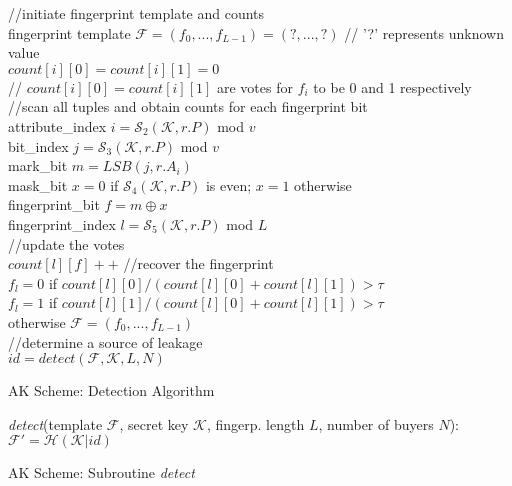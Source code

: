 \begin{algorithm}
  //initiate fingerprint template and counts \\
  fingerprint template $\mathcal{F}=(f_0,...,f_{L-1})=(?,...,?)$ // '?' represents unknown value \\
  {
    $count[i][0]=count[i][1]=0$ \\
    // $count[i][0]=count[i][1]$ are votes for $f_i$ to be 0 and 1 respectively
  }
  //scan all tuples and obtain counts for each fingerprint bit \\
  {
    {
        attribute\_index $i=\mathcal{S}_2(\mathcal{K},r.P)$ mod $v$\\
        bit\_index $j=\mathcal{S}_3(\mathcal{K}, r.P)$ mod $v$\\
        mark\_bit $m=LSB(j, r.A_i)$\\
        mask\_bit $x=0$ if $\mathcal{S}_4(\mathcal{K},r.P)$ is even; $x=1$ otherwise\\
        fingerprint\_bit $f=m \oplus x$\\
        fingerprint\_index $l=\mathcal{S}_5(\mathcal{K},r.P)$ mod $L$\\
        //update the votes\\
        $count[l][f]++$ 
    }
  }
  //recover the fingerprint\\
  {
    {
    }
    $f_l=0$ if $count[l][0]/(count[l][0]+count[l][1])>\tau$\\
    $f_l=1$ if $count[l][1]/(count[l][0]+count[l][1])>\tau$\\
     otherwise
  }
  $\mathcal{F}=(f_0,...,f_{L-1})$\\
  //determine a source of leakage\\
  $id=detect(\mathcal{F,K},L, N)$\\
  {
  }
  \Else
  {
  }
  \caption{AK Scheme: Detection Algorithm}
  \label{alg:AK-detection} 
\end{algorithm}

\begin{algorithm}
  \textit{detect}(template $\mathcal{F}$, secret key $\mathcal{K}$, fingerp. length $L$, number of buyers $N$):\\
  {
    $\mathcal{F}'=\mathcal{H}(\mathcal{K}|id)$\\
  }
  \caption{AK Scheme: Subroutine \textit{detect}}
  \label{alg:detect-subroutine} 
\end{algorithm}

